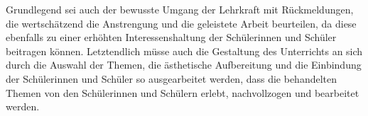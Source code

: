 Grundlegend sei auch der bewusste Umgang der Lehrkraft mit \glqq Rückmeldungen, die wertschätzend die Anstrengung und die geleistete Arbeit beurteilen\grqq{}\cite{GDS, S.25}, da diese ebenfalls zu einer erhöhten Interessenshaltung der Schülerinnen und Schüler beitragen können. 
Letztendlich müsse auch die Gestaltung des Unterrichts an sich durch die Auswahl der Themen, die ästhetische Aufbereitung und die Einbindung der Schülerinnen und Schüler so ausgearbeitet werden, dass die behandelten Themen \glqq von den Schülerinnen und Schülern erlebt, nachvollzogen und bearbeitet werden\grqq{}\cite{GDS13, S.25}.






